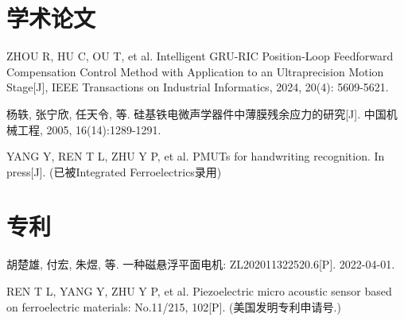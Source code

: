 \documentclass[degree=bachelor]{thuthesis}
\begin{document}
\begin{resume}
  \section*{学术论文}

  \begin{achievements}
    \item ZHOU R, HU C, OU T, et al. Intelligent GRU-RIC Position-Loop
      Feedforward Compensation Control Method with Application to an
      Ultraprecision Motion Stage[J], IEEE Transactions on Industrial
      Informatics, 2024, 20(4): 5609-5621.

    \item 杨轶, 张宁欣, 任天令, 等. 硅基铁电微声学器件中薄膜残余应力的研究[J].
      中国机械工程, 2005, 16(14):1289-1291.

    \item YANG Y, REN T L, ZHU Y P, et al. PMUTs for handwriting recognition.
      In press[J]. (已被Integrated Ferroelectrics录用)

  \end{achievements}


  \section*{专利}

  \begin{achievements}
    \item 胡楚雄, 付宏, 朱煜, 等. 一种磁悬浮平面电机: ZL202011322520.6[P]. 2022-04-01.

    \item REN T L, YANG Y, ZHU Y P, et al. Piezoelectric micro acoustic sensor
      based on ferroelectric materials: No.11/215, 102[P]. (美国发明专利申请号.)

  \end{achievements}
\end{resume}


\clearpage
\OMIT
\end{document}
